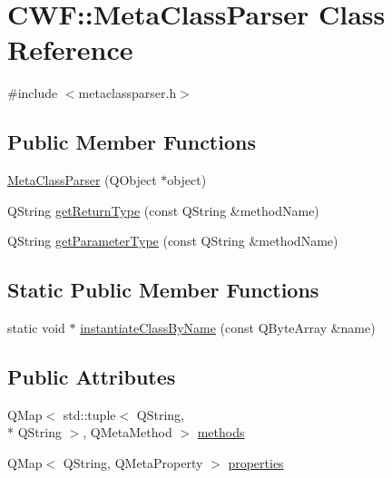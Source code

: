 \hypertarget{class_c_w_f_1_1_meta_class_parser}{\section{C\+W\+F\+:\+:Meta\+Class\+Parser Class Reference}
\label{class_c_w_f_1_1_meta_class_parser}
}


{\ttfamily \#include $<$metaclassparser.\+h$>$}

\subsection*{Public Member Functions}
\begin{DoxyCompactItemize}
\item 
\hyperlink{class_c_w_f_1_1_meta_class_parser_af831499a518f79c328a71d8d8ec53b0f}{Meta\+Class\+Parser} (Q\+Object $\ast$object)
\item 
Q\+String \hyperlink{class_c_w_f_1_1_meta_class_parser_a2bd37870867411d803411339d1d97c49}{get\+Return\+Type} (const Q\+String \&method\+Name)
\item 
Q\+String \hyperlink{class_c_w_f_1_1_meta_class_parser_a560be3a1d52f822eab715faa0b1fbe15}{get\+Parameter\+Type} (const Q\+String \&method\+Name)
\end{DoxyCompactItemize}
\subsection*{Static Public Member Functions}
\begin{DoxyCompactItemize}
\item 
static void $\ast$ \hyperlink{class_c_w_f_1_1_meta_class_parser_a0d9a5f5b026f0fc7e257fa58bbc72adf}{instantiate\+Class\+By\+Name} (const Q\+Byte\+Array \&name)
\end{DoxyCompactItemize}
\subsection*{Public Attributes}
\begin{DoxyCompactItemize}
\item 
Q\+Map$<$ std\+::tuple$<$ Q\+String, \\*
Q\+String $>$, Q\+Meta\+Method $>$ \hyperlink{class_c_w_f_1_1_meta_class_parser_a39c54c4665716493927f2e36be0c2cc9}{methods}
\item 
Q\+Map$<$ Q\+String, Q\+Meta\+Property $>$ \hyperlink{class_c_w_f_1_1_meta_class_parser_a24721c126dfff6fba83a4d5dd088ee69}{properties}
\end{DoxyCompactItemize}


